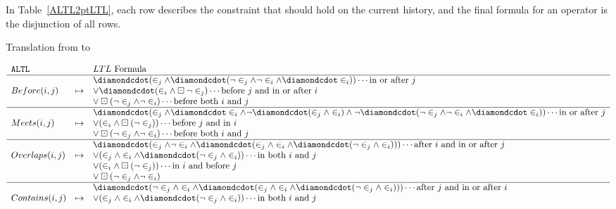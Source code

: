 \documentclass{article}
\begin{document}
\begin{enumerate}
In Table~\ref{ALTL2ptLTL}, each row describes the constraint that should hold on the current history,
and the final \ptLTL formula for an \ALTL operator is the disjunction of all rows.

\begin{table}[t]
    \caption{Translation from \ALTL to \ptLTL}\label{ALTL2ptLTL}
$$
\begin{array}{lcl}
	\ALTL         &         & LTL \text{ Formula}                                                              \\ \hline
	              &         & \PastF(\in_j\land\PastF(\neg\in_j\land\neg\in_i\land\PastF\in_i)) \cdots \text{in or after $j$} \\
	Before(i, j)  & \mapsto & \lor \PastF (\in_i \land \PastG \neg\in_j) \cdots \text{before $j$ and in or after $i$} \\
	              &         & \lor \PastG (\neg \in_j \land \neg \in_i) \cdots \text{before both $i$ and $j$} \\ \hline
	              &         & \PastF(\in_j\land\PastF\in_i\land\neg\PastF(\in_j\land\in_i)\land\neg\PastF(\neg\in_j\land\neg\in_i\land\PastF\in_i)) \cdots \text{in or after $j$} \\
	Meets(i, j)   & \mapsto & \lor (\in_i \land \PastG (\neg \in_j)) \cdots \text{before $j$ and in $i$}      \\
	              &         & \lor \PastG (\neg \in_j \land \neg \in_i) \cdots \text{before both $i$ and $j$} \\ \hline
	              &         & \PastF(\in_j\land\neg\in_i\land\PastF(\in_j\land\in_i\land\PastF(\neg\in_j\land\in_i))) \cdots \text{after $i$ and in or after $j$} \\
	Overlaps(i,j) & \mapsto & \lor (\in_j\land\in_i\land\PastF(\neg\in_j\land\in_i)) \cdots \text{in both $i$ and $j$} \\
	              &         & \lor (\in_i\land \PastG(\neg\in_j)) \cdots \text{in $i$ and before $j$}                 \\
	              &         & \lor \PastG (\neg \in_j \land \neg \in_i)                                      \\ \hline
	              &         & \PastF(\neg\in_j\land\in_i\land\PastF(\in_j\land\in_i\land\PastF(\neg\in_j\land\in_i))) \cdots \text{after $j$ and in or after $i$} \\
	Contains(i,j) & \mapsto & \lor (\in_j\land\in_i\land\PastF(\neg\in_j\land\in_i)) \cdots \text{in both $i$ and $j$} \\

\end{array}$$
\end{table}
\end{enumerate}
\end{document}
